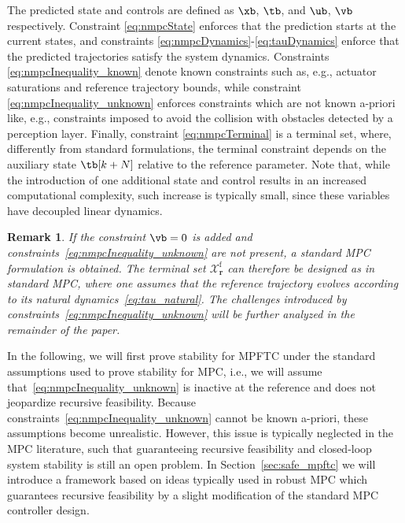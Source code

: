 \documentclass[journal]{IEEEtran}
\renewcommand{\r}{{\mathbf{r}}}
\newcommand{\review}[1]{#1}
\newtheorem{Remark}{Remark}
\begin{document}
	The predicted state and controls are defined as $\xb$, $\tb$, and $\ub$, $\vb$ respectively. Constraint \eqref{eq:nmpcState} enforces that the prediction starts at the current states, and constraints \eqref{eq:nmpcDynamics}-\eqref{eq:tauDynamics}  enforce that the predicted trajectories satisfy the system dynamics. Constraints \eqref{eq:nmpcInequality_known} denote known constraints such as, e.g., actuator saturations and reference trajectory bounds, while constraint \eqref{eq:nmpcInequality_unknown} enforces constraints which are not known a-priori 
	like, e.g., constraints imposed to avoid the collision with obstacles detected by a perception layer.
	Finally, constraint \eqref{eq:nmpcTerminal} is  a terminal set, where, differently from standard formulations, the terminal constraint depends on the auxiliary state $\tb[k+N]$ relative to the reference parameter. \review{Note that, while the introduction of one additional state and control results in an increased computational complexity, such increase is typically small, since these variables have decoupled linear dynamics.}
	
	\begin{Remark}
		If the constraint $\vb=0$ is added and constraints~\eqref{eq:nmpcInequality_unknown} are not present, a standard MPC formulation is obtained. The terminal set $\mathcal{X}^\mathrm{f}_\r$ can therefore be designed as in standard MPC, where one assumes that the reference trajectory evolves according to its natural dynamics~\eqref{eq:tau_natural}. The challenges introduced by constraints~\eqref{eq:nmpcInequality_unknown} will be further analyzed in the remainder of the paper.
	\end{Remark}
	
	
	In the following, we will first prove stability for MPFTC under the standard assumptions used to prove stability for MPC, i.e., we will assume that~\eqref{eq:nmpcInequality_unknown} is inactive at the reference and does not jeopardize recursive feasibility. 
	Because constraints~\eqref{eq:nmpcInequality_unknown} cannot be known a-priori, these assumptions become unrealistic. However, this issue is typically neglected in the MPC literature, such that guaranteeing recursive feasibility and closed-loop system stability is still an open problem. In Section~\ref{sec:safe_mpftc} we will introduce a framework based on ideas typically used in robust MPC which guarantees recursive feasibility by a slight modification of the standard MPC controller design.
	
\end{document}
